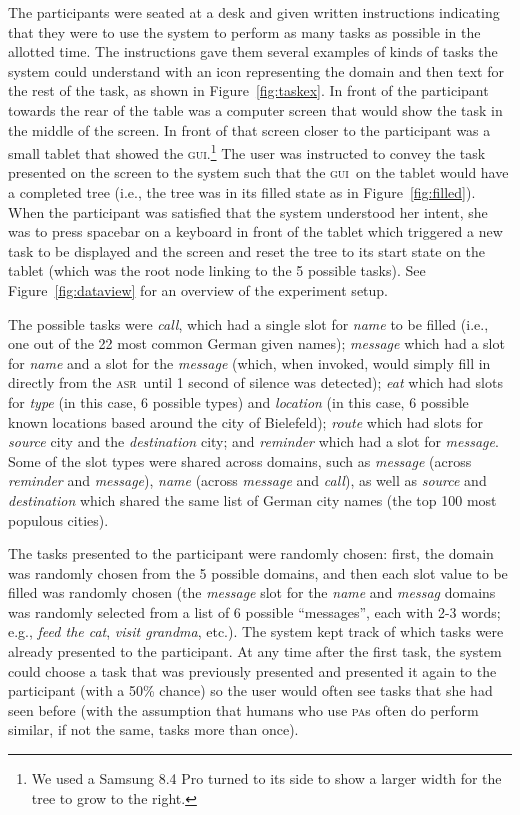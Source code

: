 \documentclass[11pt]{article}
\newcommand{\asr}[0]{\textsc{asr}}
\newcommand{\ui}[0]{\textsc{gui}}
\newcommand{\pa}[0]{\textsc{pa}}
\begin{document}
The participants were seated at a desk and given written instructions indicating that they were to use the system to perform as many tasks as possible in the allotted time. The instructions gave them several examples of kinds of tasks the system could understand with an icon representing the domain and then text for the rest of the task, as shown in Figure~\ref{fig:taskex}. In front of the participant towards the rear of the table was a computer screen that would show the task in the middle of the screen. In front of that screen closer to the participant was a small tablet that showed the \ui.\footnote{We used a Samsung 8.4 Pro turned to its side to show a larger width for the tree to grow to the right.} The user was instructed to convey the task presented on the screen to the system such that the \ui\ on the tablet would have a completed tree (i.e., the tree was in its filled state as in Figure~\ref{fig:filled}). When the participant was satisfied that the system understood her intent, she was to press spacebar on a keyboard in front of the tablet which triggered a new task to be displayed and the screen and reset the tree to its start state on the tablet (which was the root node linking to the 5 possible tasks). See Figure~\ref{fig:dataview} for an overview of the experiment setup.


The possible tasks were \emph{call}, which had a single slot for \emph{name} to be filled (i.e., one out of the 22 most common German given names); \emph{message} which had a slot for \emph{name} and a slot for the \emph{message} (which, when invoked, would simply fill in directly from the \asr\ until 1 second of silence was detected); \emph{eat} which had slots for \emph{type} (in this case, 6 possible types) and \emph{location} (in this case, 6 possible known locations based around the city of Bielefeld); \emph{route} which had slots for \emph{source} city and the \emph{destination} city; and \emph{reminder} which had a slot for \emph{message}. Some of the slot types were shared across domains, such as \emph{message} (across \emph{reminder} and \emph{message}), \emph{name} (across \emph{message} and \emph{call}), as well as \emph{source} and \emph{destination} which shared the same list of German city names (the top 100 most populous cities). 



The tasks presented to the participant were randomly chosen: first, the domain was randomly chosen from the 5 possible domains, and then each slot value to be filled was randomly chosen (the \emph{message} slot for the \emph{name} and \emph{messag} domains was randomly selected from a list of 6 possible ``messages'', each with 2-3 words; e.g., \emph{feed the cat}, \emph{visit grandma}, etc.). The system kept track of which tasks were already presented to the participant. At any time after the first task, the system could choose a task that was previously presented and presented it again to the participant (with a 50\% chance) so the user would often see tasks that she had seen before (with the assumption that humans who use \pa s often do perform similar, if not the same, tasks more than once). 
\end{document}
